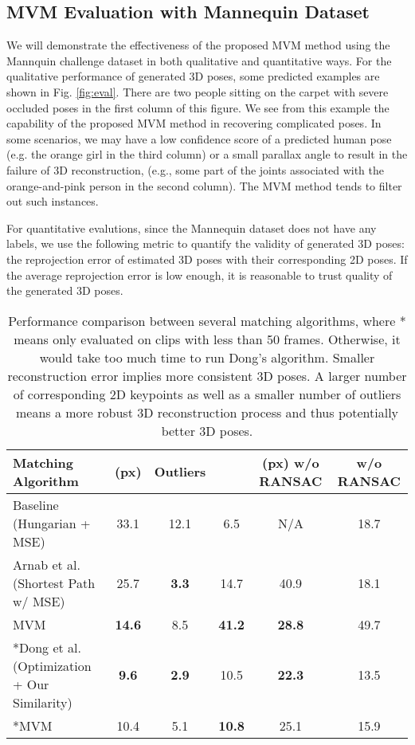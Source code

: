 \documentclass{article}
\begin{document}
\subsection{MVM Evaluation with Mannequin Dataset}

We will demonstrate the effectiveness of the proposed MVM method using
the Mannquin challenge dataset in both qualitative and quantitative
ways.  For the qualitative performance of generated 3D poses, some
predicted examples are shown in Fig. \ref{fig:eval}.  There are two
people sitting on the carpet with severe occluded poses in the first
column of this figure.  We see from this example the capability of the
proposed MVM method in recovering complicated poses. In some scenarios,
we may have a low confidence score of a predicted human pose (e.g. the
orange girl in the third column) or a small parallax angle to result in
the failure of 3D reconstruction, (e.g., some part of the joints
associated with the orange-and-pink person in the second column).  The
MVM method tends to filter out such instances. 

For quantitative evalutions, since the Mannequin dataset does not
have any labels, we use the following metric to quantify the
validity of generated 3D poses:
the reprojection error  of estimated 3D poses with their corresponding 2D poses. If the average reprojection error is low enough, it is reasonable to trust quality of the generated 3D poses. 

\begin{table}[h]
\hspace*{-1.5cm}
\centering
\begin{tabular}{l|ccc|cc} \hline \hline
Matching Algorithm &  (px)  & Outliers  
&   &  (px) w/o RANSAC  
&  w/o RANSAC \\ \hline \hline
Baseline (Hungarian + MSE) & 33.1 & 12.1 & 6.5 & N/A & 18.7 \\
Arnab et al. \cite{arnab2019exploiting} (Shortest Path w/ MSE) & 25.7 
& \textbf{3.3} & 14.7 & 40.9 & 18.1 \\
MVM & \textbf{14.6} & 8.5 & \textbf{41.2} & \textbf{28.8} & 49.7\\ \hline
*Dong et al. \cite{dong2019fast} (Optimization + Our Similarity) 
& \textbf{9.6} & \textbf{2.9} & 10.5 & \textbf{22.3} & 13.5 \\
*MVM & 10.4 & 5.1 & \textbf{10.8} & 25.1 & 15.9 \\ \hline \hline
\end{tabular}
\caption{Performance comparison between several matching algorithms,
where * means only evaluated on clips with less than 50 frames.
Otherwise, it would take too much time to run Dong's algorithm. Smaller reconstruction error  implies more consistent 3D poses. A larger number of corresponding 2D keypoints  as well as a smaller number of outliers means a more robust 3D reconstruction process and thus potentially better 3D poses.}
\label{tab:matching}
\end{table}
\end{document}
